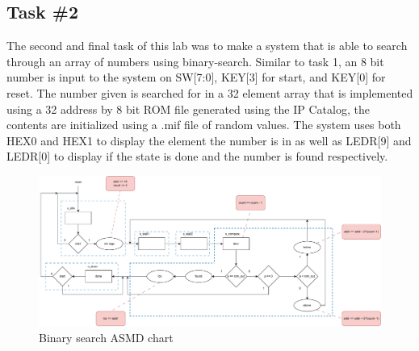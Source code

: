 \documentclass[11pt, titlepage]{article}
\begin{document}
        \subsection{Task \#2}
            The second and final task of this lab was to make a system that is able to search through an array of numbers using binary-search. Similar to task 1, an 8 bit number is input to the system on SW[7:0], KEY[3] for start, and KEY[0] for reset. The number given is searched for in a 32 element array that is implemented using a 32 address by 8 bit ROM file generated using the IP Catalog, the contents are initialized using a .mif file of random values. The system uses both HEX0 and HEX1 to display the element the number is in as well as LEDR[9] and LEDR[0] to display if the state is done and the number is found respectively.

            \begin{figure}[H]
                \centering
                \includegraphics[scale = 0.45]{Images/task 2 asmd diagram.pdf}
                \caption{Binary search ASMD chart}
            \end{figure}
\end{document}
